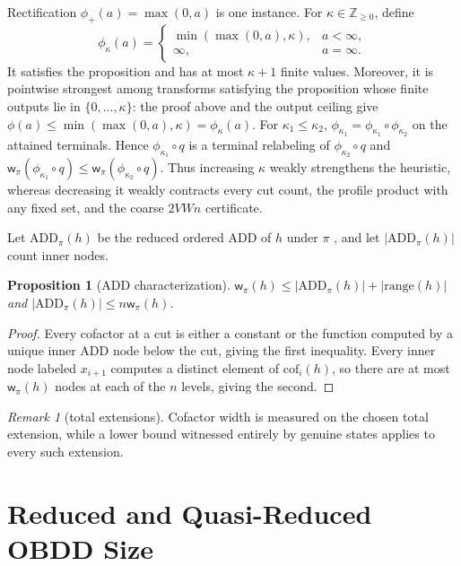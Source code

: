 \documentclass[letterpaper]{article}
\newcommand{\width}{\ensuremath{\mathsf{w}}}
\newcommand{\values}{\ensuremath{V}}
\newcommand{\sub}[2]{\ensuremath{\mathrm{cof}_{#1}(#2)}}
\newcommand{\hrange}{\ensuremath{\mathrm{range}}}
\theoremstyle{plain}
\newtheorem{proposition}{Proposition}
\theoremstyle{definition}
\theoremstyle{remark}
\newtheorem{remark}{Remark}
\begin{document}
Rectification $\phi_+(a)=\max(0,a)$ is one instance. For
$\kappa\in\mathbb Z_{\geq0}$, define
\[
\phi_\kappa(a)=
\begin{cases}
\min(\max(0,a),\kappa),&a<\infty,\\
\infty,&a=\infty.
\end{cases}
\]
It satisfies the proposition and has at most $\kappa+1$ finite values.
Moreover, it is pointwise strongest among transforms satisfying the
proposition whose finite outputs lie in $\{0,\ldots,\kappa\}$: the proof
above and the output ceiling give
$\phi(a)\leq\min(\max(0,a),\kappa)=\phi_\kappa(a)$.
For $\kappa_1\leq\kappa_2$,
$\phi_{\kappa_1}=\phi_{\kappa_1}\circ\phi_{\kappa_2}$ on the attained
terminals. Hence $\phi_{\kappa_1}\circ q$ is a terminal relabeling of
$\phi_{\kappa_2}\circ q$ and
$\width_\pi(\phi_{\kappa_1}\circ q)\leq
\width_\pi(\phi_{\kappa_2}\circ q)$. Thus increasing $\kappa$ weakly
strengthens the heuristic, whereas decreasing it weakly contracts every cut
count, the profile product with any fixed set, and the coarse $2\values Wn$
certificate.

Let $\mathrm{ADD}_\pi(h)$ be the reduced ordered ADD of $h$ under $\pi$
\citep{bahar-et-al-iccad1993}, and let $|\mathrm{ADD}_\pi(h)|$ count
inner nodes.

\begin{proposition}[ADD characterization]
\label{prop-add}
$\width_\pi(h)\leq|\mathrm{ADD}_\pi(h)|+|\hrange(h)|$ and
$|\mathrm{ADD}_\pi(h)|\leq n\width_\pi(h)$.
\end{proposition}

\begin{proof}
Every cofactor at a cut is either a constant or the function computed by a
unique inner ADD node below the cut, giving the first inequality. Every
inner node labeled $x_{i+1}$ computes a distinct element of
$\sub{i}{h}$, so there are at most $\width_\pi(h)$ nodes at each of the
$n$ levels, giving the second.
\end{proof}

\begin{remark}[total extensions]
\label{rem-encoding}
Cofactor width is measured on the chosen total extension, while a lower
bound witnessed entirely by genuine states applies to every such extension.
\end{remark}

\section{Reduced and Quasi-Reduced OBDD Size}
\end{document}

